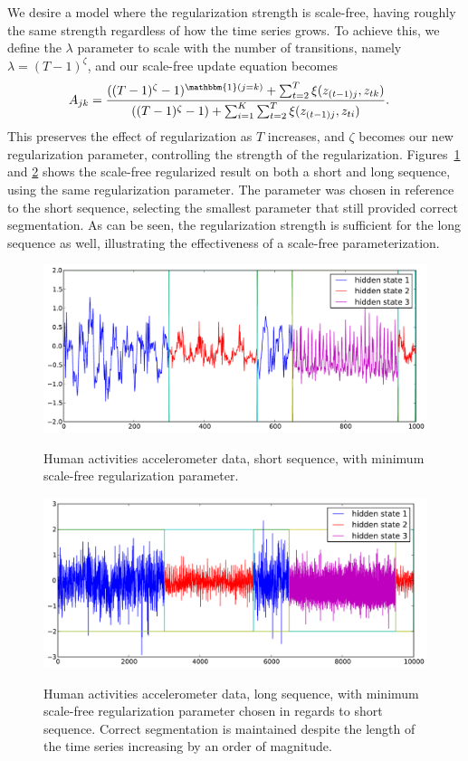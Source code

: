 \documentclass[12pt]{article}
\begin{document}
We desire a model where the regularization strength is scale-free, having roughly the same strength regardless of how the time series grows. To achieve this, we define the $\lambda$ parameter to scale with the number of transitions, namely $\lambda = (T-1)^\zeta$, and our scale-free update equation becomes
\begin{align*}
    A_{jk} &= \frac{((T - 1)^{\zeta}-1)^{\mathbbm{1}(j = k)} + \sum_{t=2}^{T} \xi(z_{(t-1)j}, z_{tk})}   
    {((T - 1)^{\zeta} - 1) + \sum_{i=1}^{K}\sum_{t=2}^{T} \xi(z_{(t-1)j}, z_{ti})}.
\end{align*}
This preserves the effect of regularization as $T$ increases, and $\zeta$ becomes our new regularization parameter, controlling the strength of the regularization. Figures~\ref{fig:short-real-data-scale-free} and \ref{fig:long-real-data-scale-free} shows the scale-free regularized result on both a short and long sequence, using the same regularization parameter. The parameter was chosen in reference to the short sequence, selecting the smallest parameter that still provided correct segmentation. As can be seen, the regularization strength is sufficient for the long sequence as well, illustrating the effectiveness of a scale-free parameterization.

\begin{figure}[htbp]
  \caption{Human activities accelerometer data, short sequence, with minimum scale-free regularization parameter.}
  \centering
    \includegraphics[width=.8\linewidth]{images/MAP_SCALE_FREE_results_hard_activity_short_3_states.pdf}
    \label{fig:short-real-data-scale-free}
\end{figure}

\begin{figure}[htbp]
  \caption{Human activities accelerometer data, long sequence, with minimum scale-free regularization parameter chosen in regards to short sequence. Correct segmentation is maintained despite the length of the time series increasing by an order of magnitude.}
  \centering
    \includegraphics[width=.8\linewidth]{images/MAP_SCALE_FREE_results_hard_activity_long_3_states.pdf}
    \label{fig:long-real-data-scale-free}
\end{figure}
\end{document}
